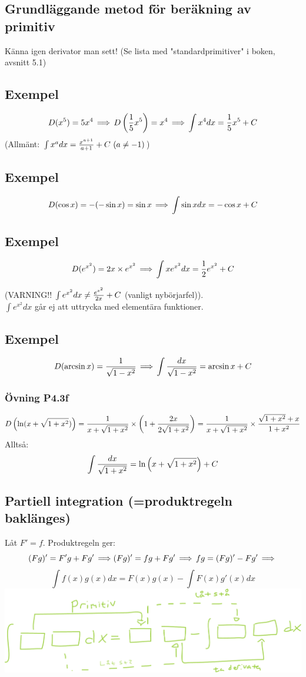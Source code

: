 \documentclass{article}
\begin{document}
\subsection{Grundläggande metod för beräkning av primitiv}
Känna igen derivator man sett!
(Se lista med "standardprimitiver" i boken, avsnitt 5.1)

\subsection{Exempel}
$$ D(x^5) = 5x^4 \operatorname{\implies} D\left(\frac{1}{5} x^5\right) = x^4 \operatorname{\implies} \int{x^4 dx} = \frac{1}{5} x^5+C $$
(Allmänt: $\int{x^a dx} = \frac{x^{a+1}}{a+1}+C\ (a\neq -1)$)

\subsection{Exempel}
$$ D(\cos x) = -(-\sin x) = \sin x \operatorname{\implies} \int{\sin x dx} = -\cos x + C $$

\subsection{Exempel}
$$ D(e^{x^2}) = 2x\times e^{x^2} \operatorname{\implies} \int{xe^{x^2} dx} = \frac{1}{2} e^{x^2} + C$$

(VARNING!! $\int{e^{x^2} dx} \neq \frac{e^{x^2}}{2x} + C$ (vanligt nybörjarfel)).\\
$\int{e^{x^2} dx}$ går ej att uttrycka med elementära funktioner.

\subsection{Exempel}
$$ D(\arcsin x) = \frac{1}{\sqrt{1-x^2}} \operatorname{\implies} \int{dx \over \sqrt{1-x^2}} = \arcsin x + C$$

\subsubsection{Övning P4.3f}
$$ D\left(\ln(x+\sqrt{1+x^2})\right) = \frac{1}{x+\sqrt{1+x^2}}\times \left(1+\frac{2x}{2\sqrt{1+x^2}}\right) = \frac{1}{x+\sqrt{1+x^2}} \times \frac{\sqrt{1+x^2} + x}{1+x^2}$$
Alltså:
$$ \int{dx \over \sqrt{1+x^2}} = \ln \left(x+\sqrt{1+x^2}\right)+C $$

\subsection{Partiell integration (=produktregeln baklänges)}
Låt $F'=f$. Produktregeln ger:
$$ (Fg)' = F'g + Fg' \operatorname{\implies} (Fg)' = fg + Fg' \operatorname{\implies} fg = (Fg)' - Fg' \operatorname{\implies}$$
$$\int{f(x)g(x) dx} = F(x)g(x) - \int{F(x)g'(x) dx} $$
\includegraphics[scale=0.5]{img/img1.pdf}
\end{document}
